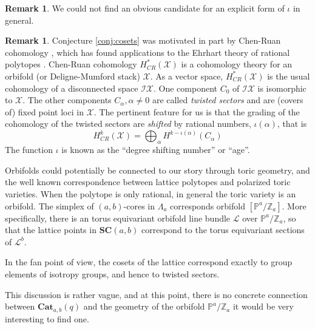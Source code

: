 \documentclass{amsart}[12pt]
\theoremstyle{definition}
\newtheorem{remark}[dummy]{Remark}
\newcommand{\Z}{\mathbb{Z}}
\newcommand{\proj}{\mathbb{P}}
\newcommand{\SC}{\mathbf{SC}}
\newcommand{\Cat}{\mathbf{Cat}}
\begin{document}
\begin{remark}
We could not find an obvious candidate for an explicit form of $\iota$ in general.


\end{remark}

\begin{remark}
Conjecture \ref{conj:cosets} was motivated in part by Chen-Ruan cohomology \cite{CR, ALR}, which has found applications to the Ehrhart theory of rational polytopes \cite{Stapledon}.  Chen-Ruan cohomology $H^*_{CR}(\mathcal{X})$ is a cohomology theory for an orbifold (or Deligne-Mumford stack) $\mathcal{X}$.   As a vector space, $H^*_{CR}(\mathcal{X})$ is the usual cohomology of a disconnected space $\mathcal{IX}$.  One component $C_0$ of $\mathcal{IX}$ is isomorphic to $\mathcal{X}$.  The other components $C_\alpha, \alpha\neq 0$ are called \emph{twisted sectors} and are (covers of) fixed point loci in $\mathcal{X}$.  The pertinent feature for us is that the grading of the cohomology of the twisted sectors are \emph{shifted} by rational numbers, $\iota(\alpha)$, that is
$$H^k_{CR}(\mathcal{X})=\bigoplus_{\alpha} H^{k-\iota(\alpha)}(C_\alpha)$$
The function $\iota$ is known as the ``degree shifting number'' or ``age''.


Orbifolds could potentially be connected to our story through toric geometry, and the well known correspondence between lattice polytopes and polarized toric varieties.  When the polytope is only rational, in general the toric variety is an orbifold. The simplex of $(a,b)$-cores in $\Lambda_a$ corresponds  orbifold $[\proj^a/\Z_a]$.  More specifically, there is an torus equivariant orbifold line bundle $\mathcal{L}$ over $\proj^a/\Z_a$, so that the lattice points in $\SC(a,b)$ correspond to the torus equivariant sections of $\mathcal{L}^b$.

In the fan point of view, the cosets of the lattice correspond exactly to group elements of isotropy groups, and hence to twisted sectors.  

This discussion is rather vague, and at this point, there is no concrete connection between $\Cat_{a,b}(q)$ and the geometry of the orbifold $\proj^a/\Z_a$ it would be very interesting to find one.

\end{remark}
\end{document}
